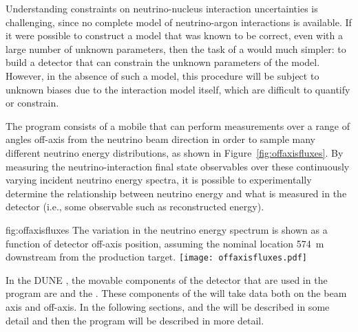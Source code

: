 Understanding   constraints on neutrino-nucleus interaction uncertainties is challenging, since no complete model of neutrino-argon interactions is available. If it were possible to construct a model that was known to be correct, even with a large number of unknown parameters, then the task of a   would much simpler: to build a detector that can constrain the unknown parameters of the model. However, in the absence of such a model, this procedure will be subject to unknown biases due to the interaction model itself, which are difficult to quantify or constrain.

The    program consists of a mobile   
that can perform measurements over a range of angles off-axis from the neutrino beam direction in order to sample many different neutrino energy distributions, as shown in Figure~\ref{fig:offaxisfluxes}. By measuring the neutrino-interaction final state observables over these continuously varying incident neutrino energy spectra, it is possible to experimentally determine the relationship between neutrino energy and what is measured in the detector (i.e., some observable such as reconstructed energy).


\begin{dunefigure}{fig:offaxisfluxes}
{The variation in the neutrino energy spectrum is shown as a function of detector off-axis position, assuming the nominal  location 574~m downstream from the production target.}
\texttt{[image: offaxisfluxes.pdf]}
\end{dunefigure}


In the DUNE , the movable components of the detector that are used in the  program are  and the .  These components of the  will take data both on the beam axis and off-axis.  In the following sections,  and the  will be described in some detail and then the  program will be described in more detail.

